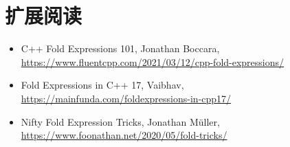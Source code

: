 \section{扩展阅读}
\begin{itemize}
\item
C++ Fold Expressions 101, Jonathan Boccara, \url{https://www.fluentcpp.com/2021/03/12/cpp-fold-expressions/}

\item
Fold Expressions in C++ 17, Vaibhav, \url{https://mainfunda.com/foldexpressions-in-cpp17/}

\item
Nifty Fold Expression Tricks, Jonathan Müller, \url{https://www.foonathan.net/2020/05/fold-tricks/}
\end{itemize}